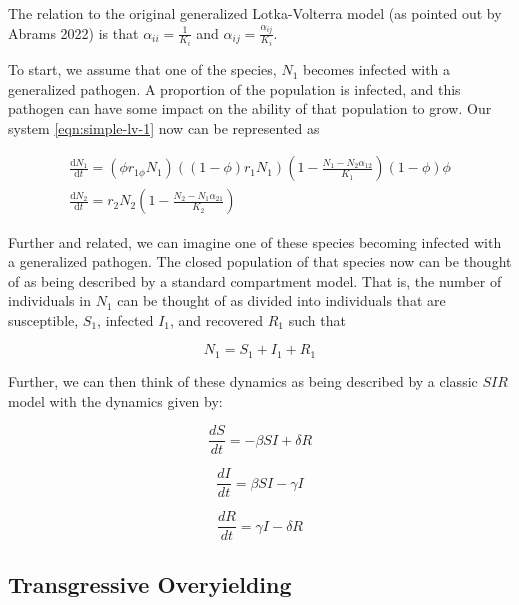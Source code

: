 \documentclass[
  letterpaper,
  DIV=11,
  numbers=noendperiod]{scrartcl}
\begin{document}
The relation to the original generalized Lotka-Volterra model (as
pointed out by Abrams 2022) is that \(\alpha_{ii} = \frac{1}{K_i}\) and
\(\alpha_{ij} = \frac{\alpha_{ij}}{K_i}\).

To start, we assume that one of the species, \(N_1\) becomes infected
with a generalized pathogen. A proportion of the population is infected,
and this pathogen can have some impact on the ability of that population
to grow. Our system \ref{eqn:simple-lv-1} now can be represented as

\begin{align}
\label{eqn:simple-lv-prop}
\frac{\mathrm{d} N_1}{\mathrm{d}t} = (\phi r_{1\phi} N_1)((1-\phi) r_1 N_1)\left( 1 - \frac{N_1 - N_2 \alpha_{1 2}}{K_1} \right) \left( 1 - \phi \right) \phi \\
\frac{\mathrm{d} N_2}{\mathrm{d}t} = r_2 N_2 \left( 1 - \frac{N_2 - N_1 \alpha_{2 1}}{K_2} \right)
\end{align}

Further and related, we can imagine one of these species becoming
infected with a generalized pathogen. The closed population of that
species now can be thought of as being described by a standard
compartment model. That is, the number of individuals in \(N_1\) can be
thought of as divided into individuals that are susceptible, \(S_1\),
infected \(I_1\), and recovered \(R_1\) such that

\begin{equation} 
\label{eqn:sum-sir}
  N_1 = S_1 + I_1 + R_1
\end{equation}

Further, we can then think of these dynamics as being described by a
classic \(SIR\) model with the dynamics given by:

\begin{equation}
\label{eqn:basic-sir-s}
  \frac{dS}{dt} = - \beta S I + \delta R 
\end{equation}

\begin{equation}
\label{eqn:basic-sir-i}
  \frac{dI}{dt} = \beta S I - \gamma I 
\end{equation}

\begin{equation}
\label{eqn:basic-sir-r}
  \frac{dR}{dt} = \gamma I - \delta R
\end{equation}

\subsection{Transgressive Overyielding}
\end{document}
